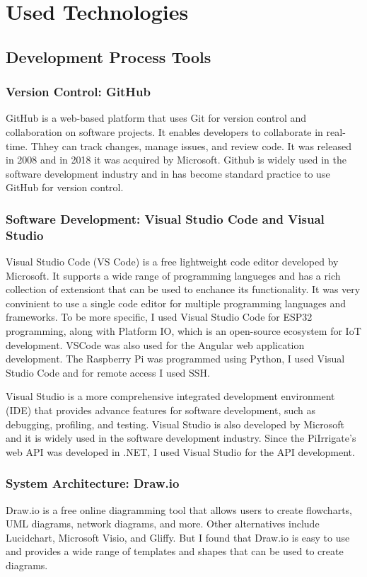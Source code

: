 \chapter{Used Technologies}
\section{Development Process Tools}
\subsection{Version Control: GitHub}
GitHub is a web-based platform that uses Git for version control and collaboration on software projects.
It enables developers to collaborate in real-time. Thhey can track changes, manage issues, and review code.
It was released in 2008 and in 2018 it was acquired by Microsoft\cite{githubDefinition}.
Github is widely used in the software development industry and in has become standard practice to 
use GitHub for version control. 

\subsection{Software Development: Visual Studio Code and Visual Studio}
Visual Studio Code (VS Code) is a free lightweight code editor developed by Microsoft.
It supports a wide range of programming langueges and has a rich collection of extensiont that can be used to 
enchance its functionality.
It was very convinient to use a single code editor for multiple programming languages and frameworks.
To be more specific, I used Visual Studio Code for ESP32 programming, along with Platform IO, 
which is an open-source ecosystem for IoT development. VSCode was also used for the Angular web application 
development. The Raspberry Pi was programmed using Python, I used Visual Studio Code and for remote access
I used SSH.

Visual Studio is a more comprehensive integrated development environment (IDE) that provides advance features
for software development, such as debugging, profiling, and testing.
Visual Studio is also developed by Microsoft and it is widely used in the software development industry.
Since the PiIrrigate's web API was developed in .NET, I used Visual Studio for the API development.

\subsection{System Architecture: Draw.io}
Draw.io is a free online diagramming tool that allows users to create flowcharts, 
UML diagrams, network diagrams, and more. 
Other alternatives include Lucidchart, Microsoft Visio, and Gliffy. But I found that Draw.io is easy to use
and provides a wide range of templates and shapes that can be used to create diagrams.

